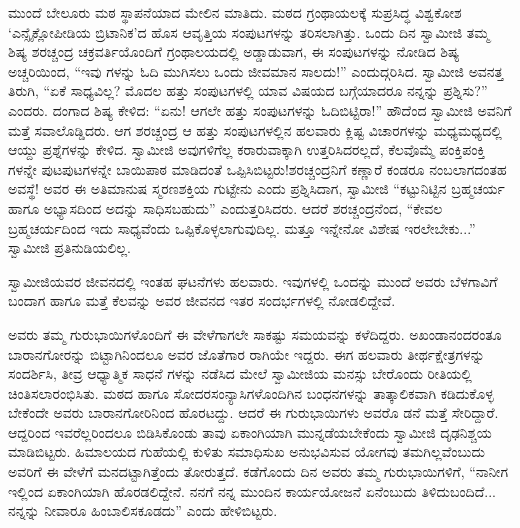 ಮುಂದೆ ಬೇಲೂರು ಮಠ ಸ್ಥಾಪನೆಯಾದ ಮೇಲಿನ ಮಾತಿದು. ಮಠದ ಗ್ರಂಥಾಯಲಕ್ಕೆ ಸುಪ್ರಸಿದ್ಧ ವಿಶ್ವಕೋಶ ‘ಎನ್ಸೈಕ್ಲೋಪೀಡಿಯ ಬ್ರಿಟಾನಿಕ’ದ ಹೊಸ ಆವೃತ್ತಿಯ ಸಂಪುಟಗಳನ್ನು ತರಿಸಲಾಗಿತ್ತು. ಒಂದು ದಿನ ಸ್ವಾಮೀಜಿ ತಮ್ಮ ಶಿಷ್ಯ ಶರಚ್ಚಂದ್ರ ಚಕ್ರವರ್ತಿಯೊಂದಿಗೆ ಗ್ರಂಥಾಲಯದಲ್ಲಿ ಅಡ್ಡಾಡುವಾಗ, ಈ ಸಂಪುಟಗಳನ್ನು ನೋಡಿದ ಶಿಷ್ಯ ಅಚ್ಚರಿಯಿಂದ, “ಇವು ಗಳನ್ನು ಓದಿ ಮುಗಿಸಲು ಒಂದು ಜೀವಮಾನ ಸಾಲದು!” ಎಂದುದ್ಗರಿಸಿದ. ಸ್ವಾಮೀಜಿ ಅವನತ್ತ ತಿರುಗಿ, “ಏಕೆ ಸಾಧ್ಯವಿಲ್ಲ? ಮೊದಲ ಹತ್ತು ಸಂಪುಟಗಳಲ್ಲಿ ಯಾವ ವಿಷಯದ ಬಗ್ಗೆಯಾದರೂ ನನ್ನನ್ನು ಪ್ರಶ್ನಿಸು?” ಎಂದರು. ದಂಗಾದ ಶಿಷ್ಯ ಕೇಳಿದ: “ಏನು! ಆಗಲೇ ಹತ್ತು ಸಂಪುಟಗಳನ್ನು ಓದಿಬಿಟ್ಟಿರಾ!” ಹೌದೆಂದ ಸ್ವಾಮೀಜಿ ಅವನಿಗೆ ಮತ್ತೆ ಸವಾಲೊಡ್ಡಿದರು. ಆಗ ಶರಚ್ಚಂದ್ರ ಆ ಹತ್ತು ಸಂಪುಟಗಳಲ್ಲಿನ ಹಲವಾರು ಕ್ಲಿಷ್ಟ ವಿಚಾರಗಳನ್ನು ಮಧ್ಯಮಧ್ಯದಲ್ಲಿ ಆಯ್ದು ಪ್ರಶ್ನೆಗಳನ್ನು ಕೇಳಿದ. ಸ್ವಾಮೀಜಿ ಅವುಗಳಿಗೆಲ್ಲ ಕರಾರುವಾಕ್ಕಾಗಿ ಉತ್ತರಿಸಿದರಲ್ಲದೆ, ಕೆಲವೊಮ್ಮೆ ಪಂಕ್ತಿಪಂಕ್ತಿ ಗಳನ್ನೇ ಪುಟಪುಟಗಳನ್ನೇ ಬಾಯಿಪಾಠ ಮಾಡಿದಂತೆ ಒಪ್ಪಿಸಿಬಿಟ್ಟರು!ಶರಚ್ಚಂದ್ರನಿಗೆ ಕಣ್ಣಾರೆ ಕಂಡರೂ ನಂಬಲಾಗದಂತಹ ಅವಸ್ಥೆ! ಅವರ ಈ ಅತಿಮಾನುಷ ಸ್ಮರಣಶಕ್ತಿಯ ಗುಟ್ಟೇನು ಎಂದು ಪ್ರಶ್ನಿಸಿದಾಗ, ಸ್ವಾಮೀಜಿ “ಕಟ್ಟುನಿಟ್ಟಿನ ಬ್ರಹ್ಮಚರ್ಯ ಹಾಗೂ ಅಭ್ಯಾಸದಿಂದ ಅದನ್ನು ಸಾಧಿಸಬಹುದು” ಎಂದುತ್ತರಿಸಿದರು. ಆದರೆ ಶರಚ್ಚಂದ್ರನೆಂದ, “ಕೇವಲ ಬ್ರಹ್ಮಚರ್ಯದಿಂದ ಇದು ಸಾಧ್ಯವೆಂದು ಒಪ್ಪಿಕೊಳ್ಳಲಾಗುವುದಿಲ್ಲ. ಮತ್ತೂ ಇನ್ನೇನೋ ವಿಶೇಷ ಇರಲೇಬೇಕು...” ಸ್ವಾಮೀಜಿ ಪ್ರತಿನುಡಿಯಲಿಲ್ಲ.

ಸ್ವಾಮೀಜಿಯವರ ಜೀವನದಲ್ಲಿ ಇಂತಹ ಘಟನೆಗಳು ಹಲವಾರು. ಇವುಗಳಲ್ಲಿ ಒಂದನ್ನು ಮುಂದೆ ಅವರು ಬೆಳಗಾವಿಗೆ ಬಂದಾಗ ಹಾಗೂ ಮತ್ತೆ ಕೆಲವನ್ನು ಅವರ ಜೀವನದ ಇತರ ಸಂದರ್ಭಗಳಲ್ಲಿ ನೋಡಲಿದ್ದೇವೆ.

ಅವರು ತಮ್ಮ ಗುರುಭಾಯಿಗಳೊಂದಿಗೆ ಈ ವೇಳೆಗಾಗಲೇ ಸಾಕಷ್ಟು ಸಮಯವನ್ನು ಕಳೆದಿದ್ದರು. ಅಖಂಡಾನಂದರಂತೂ ಬಾರಾನಗೋರನ್ನು ಬಿಟ್ಟಾಗಿನಿಂದಲೂ ಅವರ ಜೊತೆಗಾರ ರಾಗಿಯೇ ಇದ್ದರು. ಈಗ ಹಲವಾರು ತೀರ್ಥಕ್ಷೇತ್ರಗಳನ್ನು ಸಂದರ್ಶಿಸಿ, ತೀವ್ರ ಆಧ್ಯಾತ್ಮಿಕ ಸಾಧನೆ ಗಳನ್ನು ನಡೆಸಿದ ಮೇಲೆ ಸ್ವಾಮೀಜಿಯ ಮನಸ್ಸು ಬೇರೊಂದು ರೀತಿಯಲ್ಲಿ ಚಿಂತಿಸಲಾರಂಭಿಸಿತು. ಮಠದ ಹಾಗೂ ಸೋದರಸಂನ್ಯಾಸಿಗಳೊಂದಿಗಿನ ಬಂಧನಗಳನ್ನು ತಾತ್ಕಾಲಿಕವಾಗಿ ಕಡಿದುಕೊಳ್ಳ ಬೇಕೆಂದೇ ಅವರು ಬಾರಾನಗೋರಿನಿಂದ ಹೊರಟದ್ದು. ಆದರೆ ಈ ಗುರುಭಾಯಿಗಳು ಅವರೊ ಡನೆ ಮತ್ತೆ ಸೇರಿದ್ದಾರೆ. ಆದ್ದರಿಂದ ಇವರೆಲ್ಲರಿಂದಲೂ ಬಿಡಿಸಿಕೊಂಡು ತಾವು ಏಕಾಂಗಿಯಾಗಿ ಮುನ್ನಡೆಯಬೇಕೆಂದು ಸ್ವಾಮೀಜಿ ದೃಢನಿಶ್ಚಯ ಮಾಡಿಬಿಟ್ಟರು. ಹಿಮಾಲಯದ ಗುಹೆಯಲ್ಲಿ ಕುಳಿತು ಸಮಾಧಿಸುಖ ಅನುಭವಿಸುವ ಯೋಗವು ತಮಗಿಲ್ಲವೆಂಬುದು ಅವರಿಗೆ ಈ ವೇಳೆಗೆ ಮನದಟ್ಟಾಗಿತ್ತೆಂದು ತೋರುತ್ತದೆ. ಕಡೆಗೊಂದು ದಿನ ಅವರು ತಮ್ಮ ಗುರುಭಾಯಿಗಳಿಗೆ, “ನಾನೀಗ ಇಲ್ಲಿಂದ ಏಕಾಂಗಿಯಾಗಿ ಹೊರಡಲಿದ್ದೇನೆ. ನನಗೆ ನನ್ನ ಮುಂದಿನ ಕಾರ್ಯಯೋಜನೆ ಏನೆಂಬುದು ತಿಳಿದುಬಂದಿದೆ... ನನ್ನನ್ನು ನೀವಾರೂ ಹಿಂಬಾಲಿಸಕೂಡದು” ಎಂದು ಹೇಳಿಬಿಟ್ಟರು.

